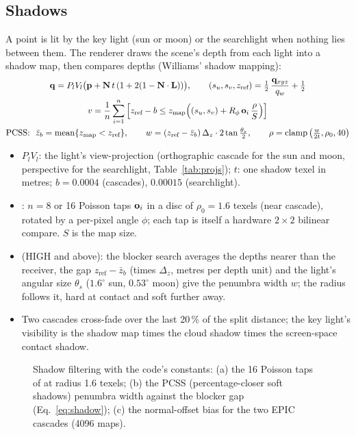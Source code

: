 \subsection{Shadows}
\label{sec:shadows}
A point is lit by the key light (sun or moon) or the searchlight when nothing lies between them. The renderer draws the
scene's depth from each light into a shadow map, then compares depths (Williams' shadow mapping):
\begin{gather}
\mathbf{q}=P_lV_l\big(\mathbf{p}+\mathbf{N}\,t\,(1+2(1-\mathbf{N}\cdot\mathbf{L}))\big),\qquad (s_u,s_v,z_{\text{ref}})=\tfrac12\,\frac{\mathbf{q}_{xyz}}{q_w}+\tfrac12\label{eq:shadow}\\
v=\frac1n\sum_{i=1}^{n}\Big[z_{\text{ref}}-b\le z_{\text{map}}\Big((s_u,s_v)+R_\phi\,\mathbf{o}_i\,\frac{\rho}{S}\Big)\Big]\nonumber\\
\text{PCSS: }\ \bar z_b=\operatorname{mean}\{z_{\text{map}}<z_{\text{ref}}\},\qquad
w=(z_{\text{ref}}-\bar z_b)\,\Delta_z\cdot2\tan\tfrac{\theta_s}{2},\qquad \rho=\operatorname{clamp}\big(\tfrac{w}{2t},\rho_0,40\big)\nonumber
\end{gather}
\begin{itemize}
\item $P_lV_l$: the light's view-projection (orthographic cascade for the sun and moon, perspective for the searchlight,
Table~\ref{tab:projs}); $t$: one shadow texel in metres; $b=0.0004$ (cascades), $0.00015$ (searchlight).
\item {}: $n=8$ or 16 Poisson taps $\mathbf{o}_i$ in a disc of $\rho_0=1.6$ texels (near cascade), rotated by a per-pixel
angle $\phi$; each tap is itself a hardware $2\times2$ bilinear compare. $S$ is the map size.
\item {} (HIGH and above): the blocker search averages the depths nearer than the receiver, the gap $z_{\text{ref}}-\bar z_b$
(times $\Delta_z$, metres per depth unit) and the light's angular size $\theta_s$ ($1.6^\circ$ sun, $0.53^\circ$ moon) give
the penumbra width $w$; the  radius follows it, hard at contact and soft further away.
\item Two cascades cross-fade over the last 20\,\% of the split distance; the key light's visibility is the shadow map
times the cloud shadow times the screen-space contact shadow.
\end{itemize}

\begin{figure}[htbp]
\centering{}
\caption{Shadow filtering with the code's constants: (a) the 16 Poisson taps of  at radius 1.6 texels;
(b) the PCSS (percentage-closer soft shadows) penumbra width against the blocker gap (Eq.~\eqref{eq:shadow}); (c) the normal-offset bias for the two
EPIC cascades (4096 maps).}
\label{fig:shadowplots}
\end{figure}

